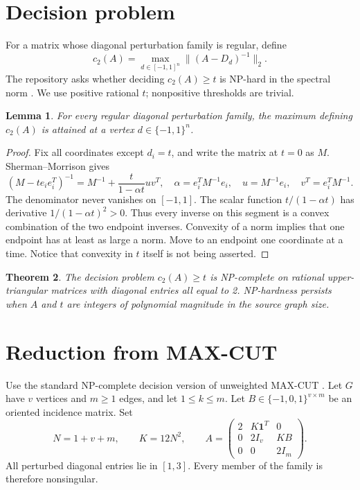 \documentclass[11pt,a4paper]{article}
\newtheorem{theorem}{Theorem}
\newtheorem{lemma}[theorem]{Lemma}
\theoremstyle{remark}\newtheorem{remark}[theorem]{Remark}
\newcommand{\one}{\mathbf 1}
\begin{document}
\section{Decision problem}
For a matrix whose diagonal perturbation family is regular, define
\[
 c_2(A)=\max_{d\in[-1,1]^n}\|(A-D_d)^{-1}\|_2.
\]
The repository asks whether deciding $c_2(A)\ge t$ is NP-hard in the spectral norm \cite{repo,condition}. We use positive rational $t$; nonpositive thresholds are trivial.
\begin{lemma}\label{lem:vertices}
For every regular diagonal perturbation family, the maximum defining $c_2(A)$ is attained at a vertex $d\in\{-1,1\}^n$.
\end{lemma}
\begin{proof}
Fix all coordinates except $d_i=t$, and write the matrix at $t=0$ as $M$. Sherman--Morrison gives
\[
 (M-te_ie_i^T)^{-1}=M^{-1}+\frac{t}{1-\alpha t}uv^T,
 \quad \alpha=e_i^TM^{-1}e_i,
 \quad u=M^{-1}e_i,\quad v^T=e_i^TM^{-1}.
\]
The denominator never vanishes on $[-1,1]$. The scalar function $t/(1-\alpha t)$ has derivative $1/(1-\alpha t)^2>0$. Thus every inverse on this segment is a convex combination of the two endpoint inverses. Convexity of a norm implies that one endpoint has at least as large a norm. Move to an endpoint one coordinate at a time. Notice that convexity in $t$ itself is not being asserted.
\end{proof}
\begin{theorem}\label{thm:hard}
The decision problem $c_2(A)\ge t$ is NP-complete on rational upper-triangular matrices with diagonal entries all equal to 2. NP-hardness persists when $A$ and $t$ are integers of polynomial magnitude in the source graph size.
\end{theorem}
\section{Reduction from MAX-CUT}
Use the standard NP-complete decision version of unweighted MAX-CUT \cite{maxcut}. Let $G$ have $v$ vertices and $m\ge1$ edges, and let $1\le k\le m$. Let $B\in\{-1,0,1\}^{v\times m}$ be an oriented incidence matrix. Set
\[
 N=1+v+m,\qquad K=12N^2,\qquad
 A=\begin{pmatrix}
 2&K\one^T&0\\
 0&2I_v&KB\\
 0&0&2I_m
 \end{pmatrix}.
\]
All perturbed diagonal entries lie in $[1,3]$. Every member of the family is therefore nonsingular.
\end{document}

